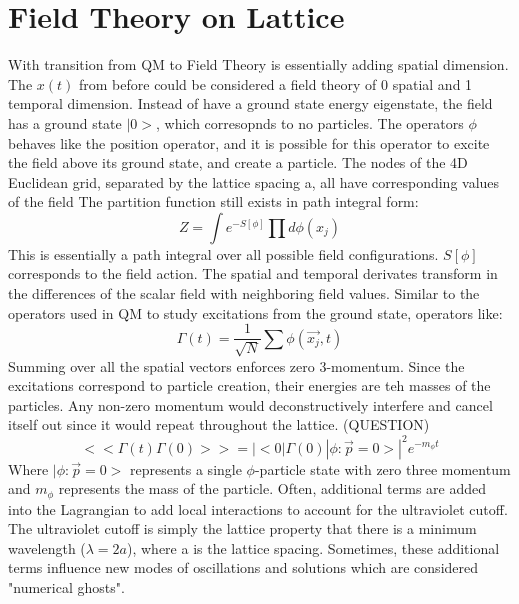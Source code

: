 \documentclass{article}
\begin{document}
\section{Field Theory on Lattice}
With transition from QM to Field Theory is essentially adding spatial dimension. The $x(t)$ from before could be considered a field theory of 0 spatial and 1 temporal dimension.
Instead of have a ground state energy eigenstate, the field has a ground state $|0>$, which corresopnds to no particles. The operators $\phi$ behaves like the position operator, 
and it is possible for this operator to excite the field above its ground state, and create a particle. \newline
The nodes of the 4D Euclidean grid, separated by the lattice spacing a, all have corresponding values of the field
The partition function still exists in path integral form: 
\begin{equation}
    Z = \int e^{-S[\phi]} \prod d\phi(x_j)
\end{equation}
This is essentially a path integral over all possible field configurations.
$S[\phi]$ corresponds to the field action. The spatial and temporal derivates transform in the differences of the scalar field with neighboring field values.
Similar to the operators used in QM to study excitations from the ground state, operators like: 
\begin{equation}
    \Gamma(t) = \frac{1}{\sqrt{N}} \sum \phi(\vec{x_j}, t)
\end{equation}
Summing over all the spatial vectors enforces zero 3-momentum. Since the excitations correspond to particle creation, their energies are teh masses of the particles.
Any non-zero momentum would deconstructively interfere and cancel itself out since it would repeat throughout the lattice. (QUESTION)
\begin{equation}
    <<\Gamma(t)\Gamma(0)>> = |<0|\Gamma(0)|\phi : \vec{p} = 0>|^2 e^{-m_\phi t}
\end{equation}
Where $|\phi : \vec{p} = 0>$ represents a single $\phi$-particle state with zero three momentum and $m_\phi$ represents the mass of the particle. \newline
Often, additional terms are added into the Lagrangian to add local interactions to account for the ultraviolet cutoff.
The ultraviolet cutoff is simply the lattice property that there is a minimum wavelength ($\lambda = 2a$), where a is the lattice spacing.
Sometimes, these additional terms influence new modes of oscillations and solutions which are considered "numerical ghosts".
\end{document}

